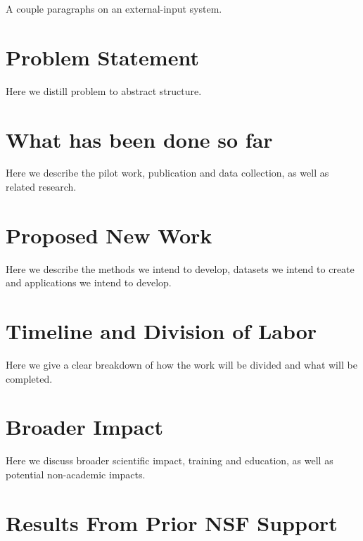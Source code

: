 A couple paragraphs on an external-input system.

\section{Problem Statement}

Here we distill problem to abstract structure.

\section{What has been done so far}

Here we describe the pilot work, publication and data collection, as well as related research.

\section{Proposed New Work}

Here we describe the methods we intend to develop, datasets we intend to create and applications we intend to develop.

\section{Timeline and Division of Labor}

Here we give a clear breakdown of how the work will be divided and what will be completed.

\section{Broader Impact}

Here we discuss broader scientific impact, training and education, as well as potential non-academic impacts.

\section{Results From Prior NSF Support}




